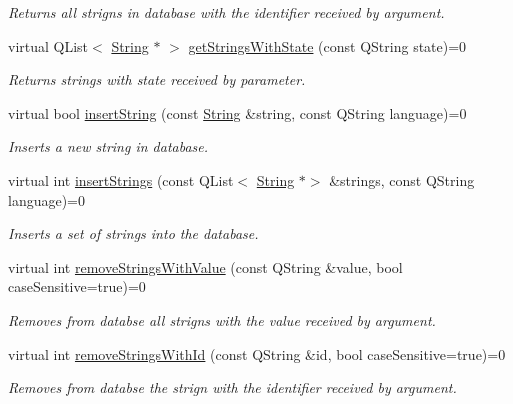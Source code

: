 \begin{DoxyCompactItemize}
\begin{DoxyCompactList}\small\item\em Returns all strigns in database with the identifier received by argument. \end{DoxyCompactList}\item 
virtual Q\+List$<$ \mbox{\hyperlink{classString}{String}} $\ast$ $>$ \mbox{\hyperlink{classDatabaseConnectorAbstract_a74952c7e14c891e33c84995066003c5a}{get\+Strings\+With\+State}} (const Q\+String state)=0
\begin{DoxyCompactList}\small\item\em Returns strings with state received by parameter. \end{DoxyCompactList}\item 
virtual bool \mbox{\hyperlink{classDatabaseConnectorAbstract_ac7cc5cf2deace9652810001722758206}{insert\+String}} (const \mbox{\hyperlink{classString}{String}} \&string, const Q\+String language)=0
\begin{DoxyCompactList}\small\item\em Inserts a new string in database. \end{DoxyCompactList}\item 
virtual int \mbox{\hyperlink{classDatabaseConnectorAbstract_a0e8c94cf0b38c797d6feef864a23347b}{insert\+Strings}} (const Q\+List$<$ \mbox{\hyperlink{classString}{String}} $\ast$$>$ \&strings, const Q\+String language)=0
\begin{DoxyCompactList}\small\item\em Inserts a set of strings into the database. \end{DoxyCompactList}\item 
virtual int \mbox{\hyperlink{classDatabaseConnectorAbstract_af482c0b4af4488c5897c04d0c4dff906}{remove\+Strings\+With\+Value}} (const Q\+String \&value, bool case\+Sensitive=true)=0
\begin{DoxyCompactList}\small\item\em Removes from databse all strigns with the value received by argument. \end{DoxyCompactList}\item 
virtual int \mbox{\hyperlink{classDatabaseConnectorAbstract_a8c2b0fa4e37d16c1b1ea1cafec166ca0}{remove\+Strings\+With\+Id}} (const Q\+String \&id, bool case\+Sensitive=true)=0
\begin{DoxyCompactList}\small\item\em Removes from databse the strign with the identifier received by argument. \end{DoxyCompactList}\item 
$$
\end{DoxyCompactItemize}
